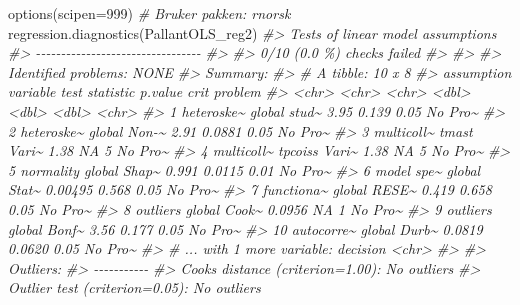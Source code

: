 \documentclass[
]{article}
\newenvironment{Shaded}{\begin{snugshade}}{\end{snugshade}}
\newcommand{\AttributeTok}[1]{\textcolor[rgb]{0.77,0.63,0.00}{#1}}
\newcommand{\CommentTok}[1]{\textcolor[rgb]{0.56,0.35,0.01}{\textit{#1}}}
\newcommand{\DecValTok}[1]{\textcolor[rgb]{0.00,0.00,0.81}{#1}}
\newcommand{\FunctionTok}[1]{\textcolor[rgb]{0.00,0.00,0.00}{#1}}
\newcommand{\NormalTok}[1]{#1}
\begin{document}
\begin{Shaded}
\begin{Highlighting}[]
\FunctionTok{options}\NormalTok{(}\AttributeTok{scipen=}\DecValTok{999}\NormalTok{)}
\CommentTok{\# Bruker pakken: rnorsk}
\FunctionTok{regression.diagnostics}\NormalTok{(PallantOLS\_reg2)}
\CommentTok{\#\textgreater{} Tests of linear model assumptions}
\CommentTok{\#\textgreater{} {-}{-}{-}{-}{-}{-}{-}{-}{-}{-}{-}{-}{-}{-}{-}{-}{-}{-}{-}{-}{-}{-}{-}{-}{-}{-}{-}{-}{-}{-}{-}{-}{-}}
\CommentTok{\#\textgreater{} }
\CommentTok{\#\textgreater{} 0/10 (0.0 \%) checks failed}
\CommentTok{\#\textgreater{} }
\CommentTok{\#\textgreater{} }
\CommentTok{\#\textgreater{} Identified problems: NONE}
\CommentTok{\#\textgreater{} Summary:}
\CommentTok{\#\textgreater{} \# A tibble: 10 x 8}
\CommentTok{\#\textgreater{}    assumption variable test  statistic p.value  crit problem}
\CommentTok{\#\textgreater{}    \textless{}chr\textgreater{}      \textless{}chr\textgreater{}    \textless{}chr\textgreater{}     \textless{}dbl\textgreater{}   \textless{}dbl\textgreater{} \textless{}dbl\textgreater{} \textless{}chr\textgreater{}  }
\CommentTok{\#\textgreater{}  1 heteroske\textasciitilde{} global   stud\textasciitilde{}   3.95     0.139   0.05 No Pro\textasciitilde{}}
\CommentTok{\#\textgreater{}  2 heteroske\textasciitilde{} global   Non{-}\textasciitilde{}   2.91     0.0881  0.05 No Pro\textasciitilde{}}
\CommentTok{\#\textgreater{}  3 multicoll\textasciitilde{} tmast    Vari\textasciitilde{}   1.38    NA       5    No Pro\textasciitilde{}}
\CommentTok{\#\textgreater{}  4 multicoll\textasciitilde{} tpcoiss  Vari\textasciitilde{}   1.38    NA       5    No Pro\textasciitilde{}}
\CommentTok{\#\textgreater{}  5 normality  global   Shap\textasciitilde{}   0.991    0.0115  0.01 No Pro\textasciitilde{}}
\CommentTok{\#\textgreater{}  6 model spe\textasciitilde{} global   Stat\textasciitilde{}   0.00495  0.568   0.05 No Pro\textasciitilde{}}
\CommentTok{\#\textgreater{}  7 functiona\textasciitilde{} global   RESE\textasciitilde{}   0.419    0.658   0.05 No Pro\textasciitilde{}}
\CommentTok{\#\textgreater{}  8 outliers   global   Cook\textasciitilde{}   0.0956  NA       1    No Pro\textasciitilde{}}
\CommentTok{\#\textgreater{}  9 outliers   global   Bonf\textasciitilde{}   3.56     0.177   0.05 No Pro\textasciitilde{}}
\CommentTok{\#\textgreater{} 10 autocorre\textasciitilde{} global   Durb\textasciitilde{}   0.0819   0.0620  0.05 No Pro\textasciitilde{}}
\CommentTok{\#\textgreater{} \# ... with 1 more variable: decision \textless{}chr\textgreater{}}
\CommentTok{\#\textgreater{} }
\CommentTok{\#\textgreater{} Outliers:}
\CommentTok{\#\textgreater{} {-}{-}{-}{-}{-}{-}{-}{-}{-}{-}{-}}
\CommentTok{\#\textgreater{} Cook\textquotesingle{}s distance (criterion=1.00): No outliers}
\CommentTok{\#\textgreater{} Outlier test (criterion=0.05): No outliers}
\end{Highlighting}
\end{Shaded}
\end{document}
